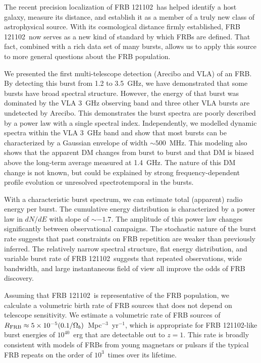 \documentclass[twocolumn]{aastex61}
\newcommand{\frb}{FRB 121102}
\begin{document}
The recent precision localization of \frb\ has helped identify a host galaxy, measure its distance, and establish it as a member of a truly new class of astrophysical source. With its cosmological distance firmly established, \frb\ now serves as a new kind of standard by which FRBs are defined. That fact, combined with a rich data set of many bursts, allows us to apply this source to more general questions about the FRB population.

We presented the first multi-telescope detection (Arecibo and VLA) of an FRB. By detecting this burst from 1.2 to 3.5~GHz, we have demonstrated that some bursts have broad spectral structure. However, the energy of that burst was dominated by the VLA 3~GHz observing band and three other VLA bursts are undetected by Arecibo. This demonstrates the burst spectra are poorly described by a power law with a single spectral index. Independently, we modelled dynamic spectra within the VLA 3~GHz band and show that most bursts can be characterized by a Gaussian envelope of width $\sim500$\ MHz. This modeling also shows that the apparent DM changes from burst to burst and that DM is biased above the long-term average measured at 1.4~GHz. The nature of this DM change is not known, but could be explained by strong frequency-dependent profile evolution or unresolved spectrotemporal in the bursts.

With a characteristic burst spectrum, we can estimate total (apparent) radio energy per burst. The cumulative energy distribution is characterized by a power law in $dN/dE$ with slope of $\sim-1.7$. The amplitude of this power law changes significantly between observational campaigns. The stochastic nature of the burst rate suggests that past constraints on FRB repetition are weaker than previously inferred. The relatively narrow spectral structure, flat energy distribution, and variable burst rate of \frb\ suggests that repeated observations, wide bandwidth, and large instantaneous field of view all improve the odds of FRB discovery.

Assuming that \frb\ is representative of the FRB population, we calculate a volumetric birth rate of FRB sources that does not depend on telescope sensitivity. We estimate a volumetric rate of FRB sources of $R_{\rm{FRB}} \approx 5\times10^{-5} (0.1/\Omega_b)$\ Mpc$^{-3}$\ yr$^{-1}$, which is appropriate for \frb-like burst energies of $10^{40}$\ erg that are detectable out to $z=1$. This rate is broadly consistent with models of FRBs from young magnetars or pulsars if the typical FRB repeats on the order of $10^3$\ times over its lifetime.
\end{document}

